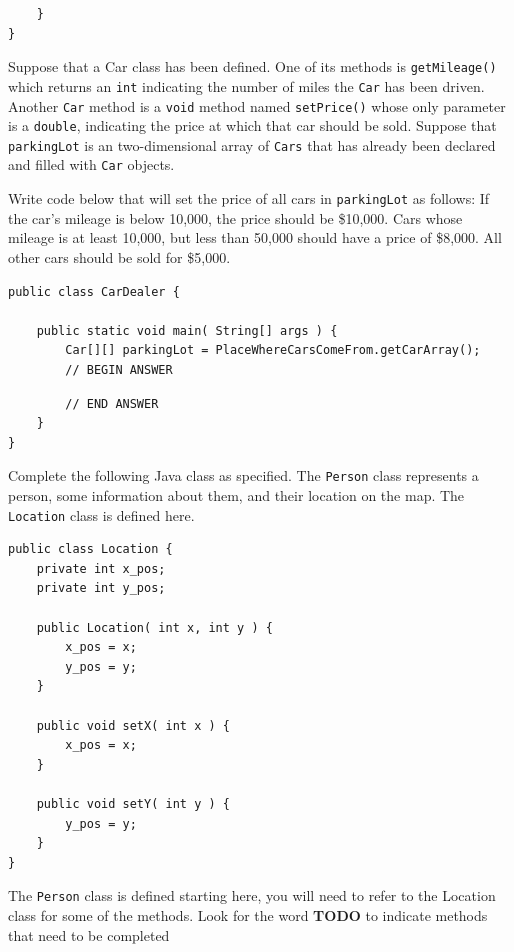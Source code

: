 \documentclass[11pt,answers]{exam}
\begin{document}
\begin{questions}
\begin{verbatim}	
    }	
}	
\end{verbatim}

\newpage
\question[12] Suppose that a Car class has been defined.  One of its methods is {\tt getMileage()} which returns an {\tt int} indicating the number of miles the {\tt Car} has been driven.  Another {\tt Car} method is a {\tt void} method named {\tt setPrice()} whose only parameter is a {\tt double}, indicating the price at which that car should be sold.  Suppose that {\tt parkingLot} is an two-dimensional array of {\tt Cars} that has already been declared and filled with {\tt Car} objects.
\par
Write code below that will set the price of all cars in {\tt parkingLot}  as follows: If the car’s mileage is below 10,000, the price should be \$10,000.  Cars whose mileage is at least 10,000, but less than 50,000 should have a price of \$8,000.  All other cars should be sold for \$5,000.

\begin{verbatim}
public class CarDealer {

    public static void main( String[] args ) {
        Car[][] parkingLot = PlaceWhereCarsComeFrom.getCarArray();
        // BEGIN ANSWER
\end{verbatim}

\begin{solution}[4.5in]
\end{solution}

\begin{verbatim}
        // END ANSWER
    }
}	
\end{verbatim}
 
\newpage

\question[13] Complete the following Java class as specified.  The {\tt Person} class represents a person, some information about them, and their location on the map.   The {\tt Location} class is defined here.
\begin{lstlisting}
public class Location {
	private int x_pos;
	private int y_pos;
	
	public Location( int x, int y ) {
		x_pos = x;
		y_pos = y;
	}
	
	public void setX( int x ) {
		x_pos = x;
	}
	
	public void setY( int y ) {
		y_pos = y;
	}
}	
\end{lstlisting}

The {\tt Person} class is defined starting here, you will need to refer to the Location class for some of the methods.   Look for the word {\bf TODO} to indicate methods that need to be completed
 

\end{questions}
\end{document}

